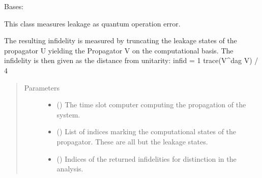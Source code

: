 \documentclass[letterpaper,10pt,english]{sphinxmanual}
\begin{document}

\begin{fulllineitems}
\label{\detokenize{qsim:qsim.cost_functions.LeakageError}}
Bases: {\hyperref[\detokenize{qsim:qsim.cost_functions.CostFunction}]{}}

This class measures leakage as quantum operation error.

The resulting infidelity is measured by truncating the leakage states of
the propagator U yielding the Propagator V on the computational basis. The
infidelity is then given as the distance from unitarity:
infid = 1 \sphinxhyphen{} trace(V\textasciicircum{}dag V) / 4
\begin{quote}\begin{description}
\item[{Parameters}] \leavevmode\begin{itemize}
\item {} 
 () \textendash{} The time slot computer computing the propagation of the system.

\item {} 
 () \textendash{} List of indices marking the computational states of the propagator.
These are all but the leakage states.

\item {} 
 () \textendash{} Indices of the returned infidelities for distinction in the analysis.

\end{itemize}


\end{description}
\end{quote}
\end{fulllineitems}
\end{document}
